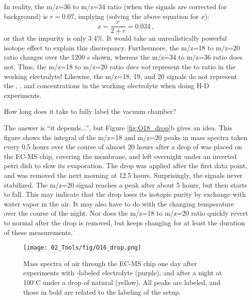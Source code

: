 In reality, the m/z=36 to m/z=34 ratio (when the signals are corrected for background) is $r=0.07$, implying (solving the above equation for $x$):
\begin{equation}
x = \frac{r}{2+r} = 0.034\,,
\end{equation}
or that the  impurity is only 3.4\%. It would take an unrealistically powerful isotope effect to explain this discrepancy. Furthermore, the m/z=18 to m/z=20 ratio changes over the 1200 s shown, whereas the m/z=34 to m/z=36 ratio does not. Thus, the m/z=18 to m/z=20 ratio \textit{does not} represent the  to  ratio in the working electrolyte! Likewise, the m/z=18, 19, and 20 signals do not represent the , , and  concentrations in the working electrolyte when doing H-D experiments.
\begin{question}
How long does it take to fully label the vacuum chamber? 
\end{question}
The answer is ``it depends...'', but Figure \ref{fig:O18_drop}b gives an idea. This figure shows the integral of the m/z=18 and m/z=20 peaks in mass spectra taken every 0.5 hours over the course of almost 20 hours after a drop of  was placed on the EC-MS chip, covering the membrane, and left overnight under an inverted petri dish to slow its evaporation. The drop was applied after the first data point, and was removed the next morning at 12.5 hours. Surprisingly, the signals never stabilized. The m/z=20 signal reaches a peak after about 5 hours, but then starts to fall. This may indicate that the drop loses its isotopic purity by exchange with water vapor in the air. It may also have to do with the changing temperature over the course of the night. Nor does the m/z=18 to m/z=20 ratio quickly revert to normal after the drop is removed, but keeps changing for at least the duration of these measurements.
\begin{figure}[t]
	\centering
	\texttt{[image: 02\_Tools/fig/O16\_drop.png]}
	\caption{Mass spectra of air through the EC-MS chip one day after experiments with -labeled electrolyte (purple), and after a night at 100$^\circ$C under a drop of natural  (yellow). All peaks are labeled, and those in bold are related to the  labeling of the setup.}
	\label{fig:O16_drop}
\end{figure}

